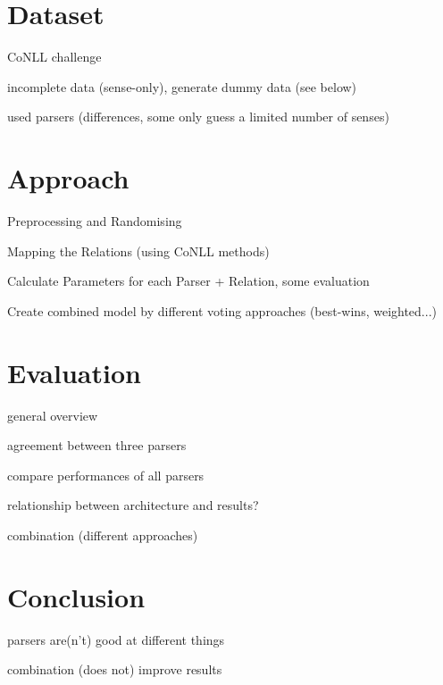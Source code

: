 \documentclass[10pt,notitlepage]{scrartcl}
\begin{document}
\section*{Dataset}
CoNLL challenge \cite{xue2016conll}

incomplete data (sense-only), generate dummy data (see below)

used parsers (differences, some only guess a limited number of senses)

\section*{Approach}
Preprocessing and Randomising

Mapping the Relations (using CoNLL methods)

Calculate Parameters for each Parser + Relation, some evaluation

Create combined model by different voting approaches (best-wins, weighted...)

\section*{Evaluation}
general overview

agreement between three parsers

compare performances of all parsers

relationship between architecture and results?

combination (different approaches)

\section*{Conclusion}
parsers are(n't) good at different things

combination (does not) improve results

\pagebreak


\end{document}
